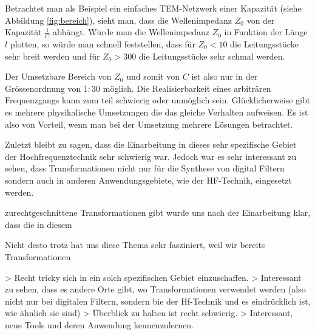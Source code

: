 Betrachtet  man als Beispiel  ein  einfaches  TEM-Netzwerk  einer  Kapazit\"at
(siehe Abbildung \ref{fig:bereich}), sieht man, dass die  Wellenimpedanz $Z_0$
von  der Kapazit\"at $\frac{1}{C}$ abh\"angt. W\"urde man  die  Wellenimpedanz
$Z_0$ in Funktion der L\"ange $l$ plotten, so w\"urde man schnell feststellen,
dass f\"ur $Z_0<10$ die Leitungsst\"ucke sehr breit werden und  f\"ur  $Z_0  >
300$ die Leitungsst\"ucke sehr schmal werden.

Der Umsetzbare Bereich von $Z_0$ und  somit  von  $C$  ist  also  nur  in  der
Gr\"ossenordnung von $1:30$ m\"oglich. Die Realisierbarkeit eines arbitr\"aren
Frequenzgangs    kann    zum    teil   schwierig   oder   unm\"oglich    sein.
Gl\"ucklicherweise gibt es  mehrere  physikalische Umsetzungen die das gleiche
Verhalten aufweisen.  Es  ist  also  von  Vorteil,  wenn man bei der Umsetzung
mehrere L\"osungen betrachtet.



Zuletzt bleibt zu sagen, dass die Einarbeitung in dieses sehr spezifische Gebiet der Hochfrequenztechnik sehr schwierig war. Jedoch war es sehr interessant zu sehen, dass Transformationen nicht nur für die Synthese von digital Filtern sondern auch in anderen Anwendungsgebiete, wie der HF-Technik,  eingesetzt werden.


zurechtgeschnittene Transformationen gibt   wurde uns nach der Einarbeitung klar, dass die in diesem 

Nicht desto trotz hat uns diese Thema sehr fasziniert, weil wir bereits Transformationen 

> Recht tricky sich in ein solch spezifischen Gebiet einzuschaffen. 
> Interessant zu sehen, dass es andere Orte gibt, wo Transformationen verwendet werden (also nicht nur bei digitalen Filtern, sondern bie der Hf-Technik und es eindrücklich ist, wie ähnlich sie sind)
> Überblick zu halten ist recht schwierig.
> Interessant, neue Tools und deren Anwendung kennenzulernen.


